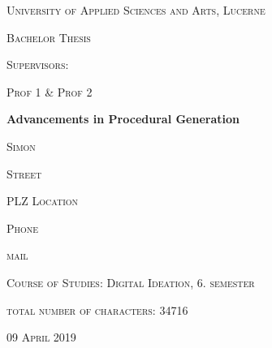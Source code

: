 \begin{titlepage}
\centering
\vspace{1cm}
	{\scshape\LARGE University of Applied Sciences and Arts, Lucerne \par}
	\vspace{0.5cm}
	{\scshape\Large Bachelor Thesis \par}
	\vspace{1cm}
	{\scshape\Large Supervisors: \par}
	{\scshape\Large Prof 1 \& Prof 2\par}
	\vspace{1.5cm}
	{\huge\bf Advancements in Procedural Generation \par}
	
	\vspace{4cm}
	{\scshape\Large Simon \par}
	{\scshape\Large Street\par}
	{\scshape\Large PLZ Location\par}
	{\scshape\Large Phone\par}
	{\scshape\Large mail \par}
	\vspace{2cm}
	{\scshape\Large Course of Studies: Digital Ideation, 6. semester \par}
	{\scshape\Large total number of characters: 34716 \par}
	\vfill

	{\scshape\large 09 April 2019\par}
\end{titlepage}